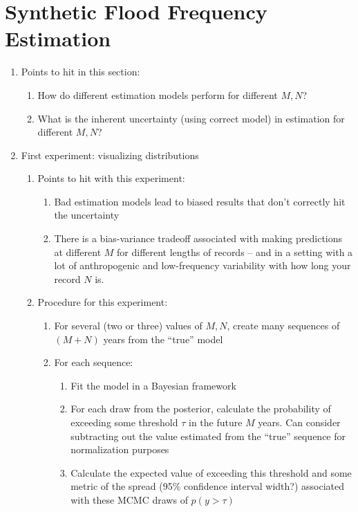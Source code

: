 \section{Synthetic Flood Frequency Estimation}

\begin{enumerate}
  \item Points to hit in this section:
  \begin{enumerate}
    \item How do different estimation models perform for different $M,N$?
    \item What is the inherent uncertainty (\ie using correct model) in estimation for different $M,N$?
  \end{enumerate}
  \item First experiment: visualizing distributions
  \begin{enumerate}
    \item Points to hit with this experiment:
    \begin{enumerate}
      \item Bad estimation models lead to biased results that don't correctly hit the uncertainty
      \item There is a bias-variance tradeoff associated with making predictions at different $M$ for different lengths of records -- and in a setting with a lot of anthropogenic and low-frequency variability with how long your record $N$ is.
    \end{enumerate}
    \item Procedure for this experiment:
    \begin{enumerate}
      \item For several (two or three) values of $M,N$, create many sequences of $(M+N)$ years from the ``true'' model
      \item For each sequence:
      \begin{enumerate}
        \item Fit the model in a Bayesian framework
        \item For each draw from the posterior, calculate the probability of exceeding some threshold $\tau$ in the future $M$ years. Can consider subtracting out the value estimated from the ``true'' sequence for normalization purposes
        \item Calculate the expected value of exceeding this threshold and some metric of the spread (95\% confidence interval width?) associated with these MCMC draws of $p(y > \tau)$
      \end{enumerate}

\end{enumerate}
\end{enumerate}
\end{enumerate}
